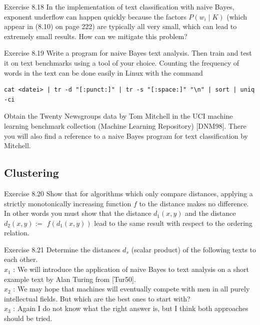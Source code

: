 \documentclass[10pt]{book}
\begin{document}
Exercise 8.18 In the implementation of text classification with naive Bayes, exponent underflow can happen quickly because the factors $P\left(w_{i} \mid K\right)$ (which appear in (8.10) on page 222) are typically all very small, which can lead to extremely small results. How can we mitigate this problem?

Exercise 8.19 Write a program for naive Bayes text analysis. Then train and test it on text benchmarks using a tool of your choice. Counting the frequency of words in the text can be done easily in Linux with the command

\begin{verbatim}
cat <datei> | tr -d "[:punct:]" | tr -s "[:space:]" "\n" | sort | uniq -ci
\end{verbatim}

Obtain the Twenty Newsgroups data by Tom Mitchell in the UCI machine learning benchmark collection (Machine Learning Repository) [DNM98]. There you will also find a reference to a naive Bayes program for text classification by Mitchell.

\subsection{Clustering}
Exercise 8.20 Show that for algorithms which only compare distances, applying a strictly monotonically increasing function $f$ to the distance makes no difference. In other words you must show that the distance $d_{1}(x, y)$ and the distance $d_{2}(x, y):=$ $f\left(d_{1}(x, y)\right)$ lead to the same result with respect to the ordering relation.

Exercise 8.21 Determine the distances $d_{s}$ (scalar product) of the following texts to each other.\\
$x_{1}$ : We will introduce the application of naive Bayes to text analysis on a short example text by Alan Turing from [Tur50].\\
$x_{2}$ : We may hope that machines will eventually compete with men in all purely intellectual fields. But which are the best ones to start with?\\
$x_{3}$ : Again I do not know what the right answer is, but I think both approaches should be tried.
\end{document}
